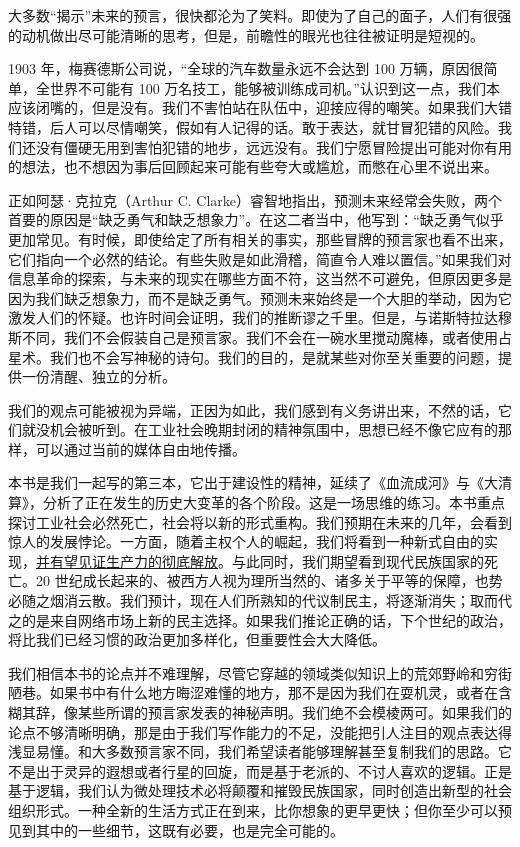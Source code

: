 大多数“揭示”未来的预言，很快都沦为了笑料。即使为了自己的面子，人们有很强的动机做出尽可能清晰的思考，但是，前瞻性的眼光也往往被证明是短视的。


1903 年，梅赛德斯公司说，“全球的汽车数量永远不会达到 100 万辆，原因很简单，全世界不可能有 100 万名技工，能够被训练成司机。”认识到这一点，我们本应该闭嘴的，但是没有。我们不害怕站在队伍中，迎接应得的嘲笑。如果我们大错特错，后人可以尽情嘲笑，假如有人记得的话。敢于表达，就甘冒犯错的风险。我们还没有僵硬无用到害怕犯错的地步，远远没有。我们宁愿冒险提出可能对你有用的想法，也不想因为事后回顾起来可能有些夸大或尴尬，而憋在心里不说出来。


正如阿瑟·克拉克（Arthur C. Clarke）睿智地指出，预测未来经常会失败，两个首要的原因是“缺乏勇气和缺乏想象力”。在这二者当中，他写到：“缺乏勇气似乎更加常见。有时候，即使给定了所有相关的事实，那些冒牌的预言家也看不出来，它们指向一个必然的结论。有些失败是如此滑稽，简直令人难以置信。”如果我们对信息革命的探索，与未来的现实在哪些方面不符，这当然不可避免，但原因更多是因为我们缺乏想象力，而不是缺乏勇气。预测未来始终是一个大胆的举动，因为它激发人们的怀疑。也许时间会证明，我们的推断谬之千里。但是，与诺斯特拉达穆斯不同，我们不会假装自己是预言家。我们不会在一碗水里搅动魔棒，或者使用占星术。我们也不会写神秘的诗句。我们的目的，是就某些对你至关重要的问题，提供一份清醒、独立的分析。


我们的观点可能被视为异端，正因为如此，我们感到有义务讲出来，不然的话，它们就没机会被听到。在工业社会晚期封闭的精神氛围中，思想已经不像它应有的那样，可以通过当前的媒体自由地传播。


本书是我们一起写的第三本，它出于建设性的精神，延续了《血流成河》与《大清算》，分析了正在发生的历史大变革的各个阶段。这是一场思维的练习。本书重点探讨工业社会必然死亡，社会将以新的形式重构。我们预期在未来的几年，会看到惊人的发展悖论。一方面，随着主权个人的崛起，我们将看到一种新式自由的实现，\uline{并有望见证生产力的彻底解放}。与此同时，我们期望看到现代民族国家的死亡。20 世纪成长起来的、被西方人视为理所当然的、诸多关于平等的保障，也势必随之烟消云散。我们预计，现在人们所熟知的代议制民主，将逐渐消失；取而代之的是来自网络市场上新的民主选择。如果我们推论正确的话，下个世纪的政治，将比我们已经习惯的政治更加多样化，但重要性会大大降低。


我们相信本书的论点并不难理解，尽管它穿越的领域类似知识上的荒郊野岭和穷街陋巷。如果书中有什么地方晦涩难懂的地方，那不是因为我们在耍机灵，或者在含糊其辞，像某些所谓的预言家发表的神秘声明。我们绝不会模棱两可。如果我们的论点不够清晰明确，那是由于我们写作能力的不足，没能把引人注目的观点表达得浅显易懂。和大多数预言家不同，我们希望读者能够理解甚至复制我们的思路。它不是出于灵异的遐想或者行星的回旋，而是基于老派的、不讨人喜欢的逻辑。正是基于逻辑，我们认为微处理技术必将颠覆和摧毁民族国家，同时创造出新型的社会组织形式。一种全新的生活方式正在到来，比你想象的更早更快；但你至少可以预见到其中的一些细节，这既有必要，也是完全可能的。


